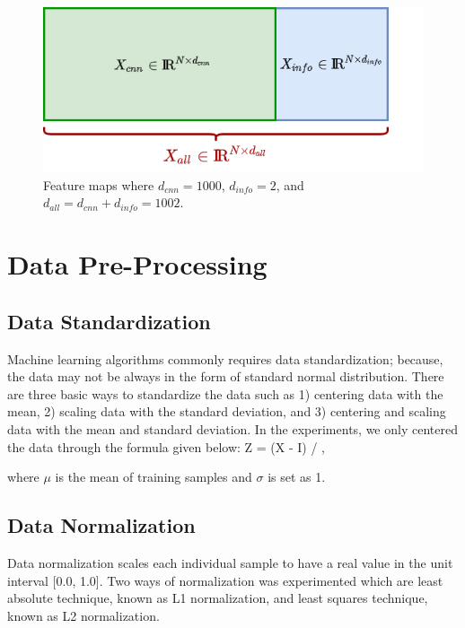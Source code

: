 \begin{figure}[h]
	\centering
	\includegraphics[width=.6\linewidth]{fig/feature_maps.png}
	\vspace{2mm}
	\caption{Feature maps where $d_{cnn} = 1000$, $d_{info} = 2$, and $d_{all} = d_{cnn} + d_{info} = 1002$.}
	\label{fig:feature_maps}
\end{figure}

\section{Data Pre-Processing}

\subsection{Data Standardization}

Machine learning algorithms commonly requires data standardization; because, the data may not be always in the form of standard normal distribution. There are three basic ways to standardize the data such as 1) centering data with the mean, 2) scaling data with the standard deviation, and 3) centering and scaling data with the mean and standard deviation. In the experiments, we only centered the data through the formula given below:
\be
\label{eq:data_standardization}
Z = (X - \mu * I) / \sigma\:,
\ee

where $\mu$ is the mean of training samples and $\sigma$ is set as 1. 


\subsection{Data Normalization}

Data normalization scales each individual sample to have a real value in the unit interval [0.0, 1.0]. Two ways of normalization was experimented which are least absolute technique, known as L1 normalization, and least squares technique, known as L2 normalization.


